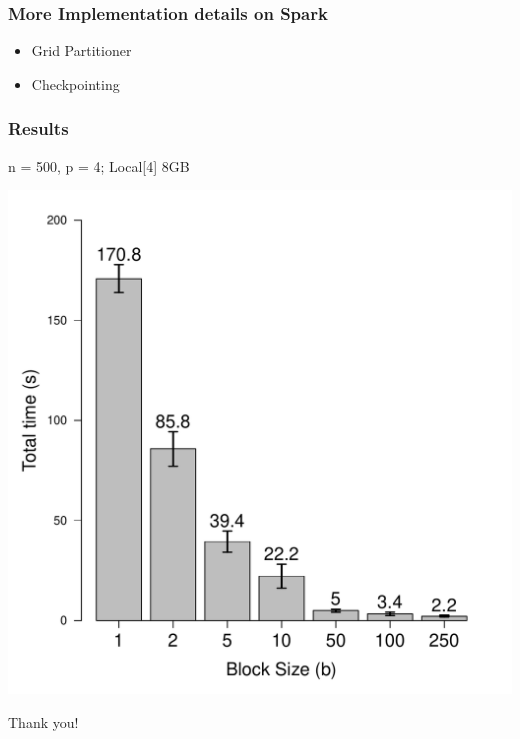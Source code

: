 \documentclass{beamer}
\begin{document}
\begin{frame}
\frametitle{More Implementation details on Spark}
\begin{itemize}
\item Grid Partitioner
\item Checkpointing

\end{itemize}
\end{frame}

\begin{frame}
\frametitle{Results}
n = 500, p = 4; Local[4] 8GB
\begin{center}
\includegraphics[scale = 0.4]{time.pdf}
\end{center}

\end{frame}

\begin{frame}
\begin{center}
Thank you!
\end{center}
\end{frame}
\end{document}
